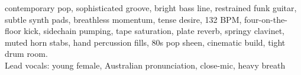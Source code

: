 

\begin{notes}
\end{notes}

\begin{style}
contemporary pop, sophisticated groove, bright bass line, restrained funk guitar, subtle synth pads, breathless momentum, tense desire, 132 BPM, four-on-the-floor kick, sidechain pumping, tape saturation, plate reverb, springy clavinet, muted horn stabs, hand percussion fills, 80s pop sheen, cinematic build, tight drum room.\\
Lead vocals: young female, Australian pronunciation, close-mic, heavy breath
\end{style}

